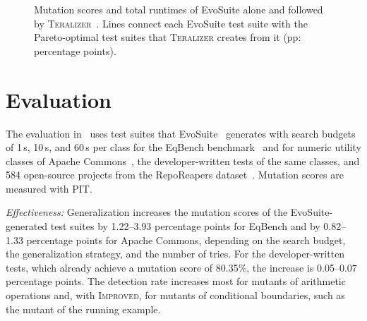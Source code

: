 \documentclass[10pt,conference]{IEEEtran}
\newcommand{\Teralizer}{\textsc{Teralizer}}
\newcommand{\runin}[1]{\textit{#1:}}
\newcommand{\Improved}{\textsc{Improved}}
\begin{document}
\begin{figure}[t]
\centering

\caption{Mutation scores and total runtimes of EvoSuite alone and followed by \Teralizer{}~\cite{glock_2025_teralizer}. Lines connect each EvoSuite test suite with the Pareto-optimal test suites that \Teralizer{} creates from it (pp: percentage points).}
\label{fig:efficiency}
\end{figure}

\section{Evaluation}
\label{sec:evaluation}

The evaluation in~\cite{glock_2025_teralizer} uses test suites that EvoSuite~\cite{fraser_2011_evosuite} generates with search budgets of 1\,s, 10\,s, and 60\,s per class for the EqBench benchmark~\cite{badihi_2021_eqbench} and for numeric utility classes of Apache Commons~\cite{apache_commons}, the developer-written tests of the same classes, and 584 open-source projects from the RepoReapers dataset~\cite{munaiah_2017_reporeapers}.
Mutation scores are measured with PIT.

\runin{Effectiveness}
Generalization increases the mutation scores of the EvoSuite-generated test suites by 1.22--3.93 percentage points for EqBench and by 0.82--1.33 percentage points for Apache Commons, depending on the search budget, the generalization strategy, and the number of tries.
For the developer-written tests, which already achieve a mutation score of 80.35\%, the increase is 0.05--0.07 percentage points.
The detection rate increases most for mutants of arithmetic operations and, with \Improved{}, for mutants of conditional boundaries, such as the mutant of the running example.
\end{document}
